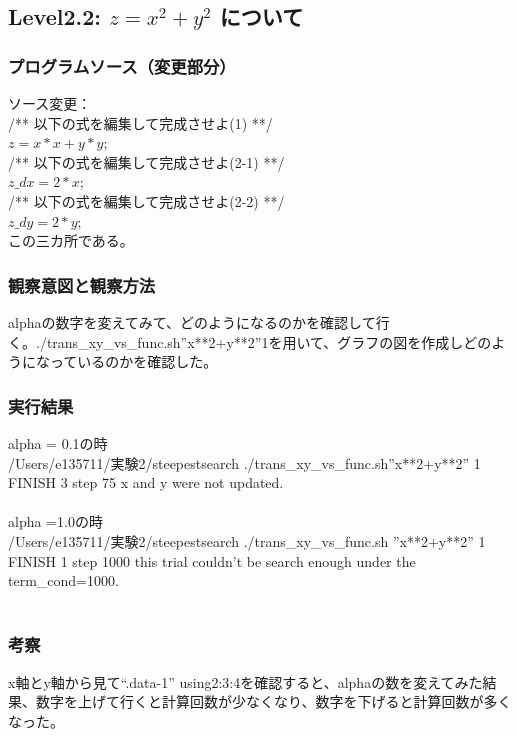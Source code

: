 \subsection{Level2.2: $z=x^2 + y^2$ について}
\subsubsection{プログラムソース（変更部分）}
ソース変更：\\
/** 以下の式を編集して完成させよ(1) **/\\
 $ z = x*x + y*y$;\\
/** 以下の式を編集して完成させよ(2-1) **/\\
$z\_dx = 2*x$;\\
/** 以下の式を編集して完成させよ(2-2) **/\\
$z\_dy = 2*y$;\\
この三カ所である。\\
\subsubsection{観察意図と観察方法}
alphaの数字を変えてみて、どのようになるのかを確認して行く。./trans\_xy\_vs\_func.sh''x**2+y**2''1を用いて、グラフの図を作成しどのようになっているのかを確認した。\\
\subsubsection{実行結果}
alpha = 0.1の時\\
/Users/e135711/実験2/steepestsearch ./trans\_xy\_vs\_func.sh''x**2+y**2'' 1\\
FINISH 3 step 75 x and y were not updated.\\
\\
alpha =1.0の時\\
/Users/e135711/実験2/steepestsearch ./trans\_xy\_vs\_func.sh ''x**2+y**2'' 1\\
FINISH 1 step 1000 this trial couldn't be search enough under the term\_cond=1000.\\
\\
\subsubsection{考察}
 x軸とy軸から見て“.data-1” using2:3:4を確認すると、alphaの数を変えてみた結果、数字を上げて行くと計算回数が少なくなり、数字を下げると計算回数が多くなった。\\
